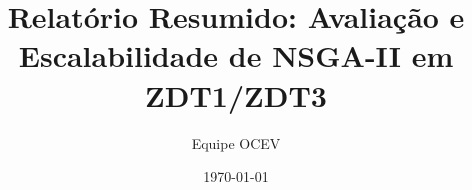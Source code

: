 \documentclass[12pt,a4paper]{article}
\title{Relatório Resumido: Avaliação e Escalabilidade de NSGA-II em ZDT1/ZDT3}
\author{Equipe OCEV}
\date{\today}
\begin{document}
\maketitle
\thispagestyle{empty}
\begin{abstract}

\end{abstract}

\vspace{1em}





\end{document}
